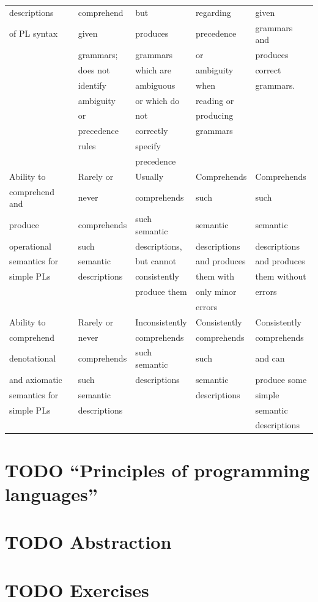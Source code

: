 \documentclass[11pt]{article}
\theoremstyle{definition}
\begin{document}
\begin{scriptsize}
\begin{center}
\begin{tabular}{|l|l|l|l|l|}
descriptions & comprehend & but & regarding & given \\
of PL syntax & given & produces & precedence & grammars and \\
 & grammars; & grammars & or & produces \\
 & does not & which are & ambiguity & correct \\
 & identify & ambiguous & when & grammars. \\
 & ambiguity & or which do & reading or & \\
 & or & not & producing & \\
 & precedence & correctly & grammars & \\
 & rules & specify & & \\
 & & precedence & & \\
\hline
Ability to & Rarely or & Usually & Comprehends & Comprehends \\
comprehend and & never & comprehends & such & such \\
produce & comprehends & such semantic & semantic & semantic \\
operational & such & descriptions, & descriptions & descriptions \\
semantics for & semantic & but cannot & and produces & and produces \\
simple PLs & descriptions & consistently & them with & them without \\
 & & produce them & only minor & errors \\
 & & & errors & \\
\hline
Ability to & Rarely or & Inconsistently & Consistently & Consistently \\
comprehend & never & comprehends & comprehends & comprehends \\
denotational & comprehends & such semantic & such & and can \\
and axiomatic & such & descriptions & semantic & produce some \\
semantics for & semantic & & descriptions & simple \\
simple PLs & descriptions & & & semantic \\
 & & & & descriptions \\
\hline
\end{tabular}
\end{center}
\end{scriptsize}

\section{{\bfseries\sffamily TODO} “Principles of programming languages”}
\label{sec:orgf4f9590}
\section{{\bfseries\sffamily TODO} Abstraction}
\label{sec:orge9a1c9d}
\section{{\bfseries\sffamily TODO} Exercises}
\label{sec:org149b6a4}
\end{document}
